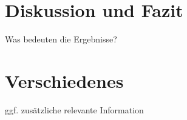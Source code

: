 \documentclass[11pt,a4paper]{scrartcl} %
\begin{document}
\section{Diskussion und Fazit}
Was bedeuten die Ergebnisse?
\section*{Verschiedenes} %
ggf. zusätzliche relevante Information

\end{document}

